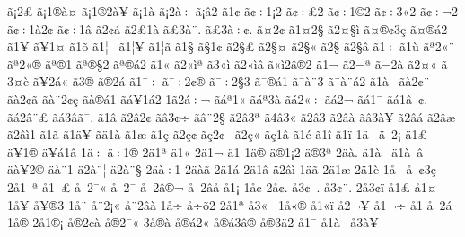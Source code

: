 {^^e3^^a12^^a3
^^e3^^a11^^ae^^e0^^a4
^^e3^^a11^^ae2^^e0^^a5
^^e3^^a11^^e0
^^e3^^a12^^e0^^f7
^^e3^^a1^^e22
^^e31^^a2
^^e3^^a2^^f71^^a12
^^e3^^a2^^f7^^a32
^^e3^^a2^^f71^^a92
^^e3^^a2^^f73^^ab2
^^e3^^a2^^f7^^ac2
^^e3^^a2^^f71^^e02^^a2
^^e3^^a2^^f71^^e2
^^e32^^a2^^e1
^^e32^^a31^^e0
^^e3^^a33^^e0^^a8.
^^e3^^a33^^e0^^f7^^a2.
^^e3^^a42^^a2
^^e31^^a42^^a7
^^e32^^a4^^a7^^ec
^^e3^^a4^^ae^^a23^^e7
^^e3^^a4^^ae^^e12
^^e31^^a5
^^e3^^a51^^a4
^^e31^^f5
^^e31^^a6^^a0
^^e31^^a6^^a5
^^e31^^a6^^e3
^^e31^^a7
^^e3^^a71^^a2
^^e32^^a7^^a3
^^e32^^a7^^a4
^^e32^^a7^^ab
^^e32^^a7^^ad
^^e32^^a7^^e2
^^e31^^f7
^^e31^^f9
^^e3^^aa2^^ab^^a8
^^e3^^aa2^^ab^^ae
^^e3^^aa^^ae1
^^e3^^aa^^ae^^a72
^^e3^^aa^^ae^^e12
^^e31^^ab
^^e32^^ab^^ec^^aa
^^e33^^ab^^ec^^ad
^^e32^^ab^^ec^^e2
^^e3^^ab^^ec2^^e2^^ae2
^^e31^^ac
^^e32^^ac^^aa
^^e3^^ac2^^e0
^^e3^^ad2^^a4^^ab
^^e3^^ad3^^a4^^e8
^^e3^^ad^^a52^^e1^^ab
^^e33^^ae
^^e3^^ae2^^e1
^^e31^^af^^f7
^^e3^^af^^f72^^a2^^ae
^^e3^^af^^f72^^a73
^^e3^^af^^ae^^e11
^^e3^^af^^e0^^a83
^^e3^^af^^e0^^a8^^e12
^^e31^^e0^^a0
^^e3^^e02^^a2^^a8
^^e3^^e02^^a2^^e3
^^e3^^e0^^a82^^a2^^e7
^^e3^^e0^^ae^^e11
^^e3^^e1^^a51^^e12
1^^e32^^e1^^f7^^ac
^^e3^^e1^^aa1^^ab
^^e3^^e1^^aa3^^e0
^^e3^^e12^^ab^^f7
^^e3^^e12^^ac
^^e3^^e11^^af
^^e3^^e11^^e2^^a0^^a2.
^^e3^^e12^^e2^^a8^^a3
^^e3^^e13^^e2^^e3^^af.
^^e31^^e2
^^e32^^e22^^a2
^^e3^^e23^^a2^^f7
^^e3^^e2^^a82^^a7
^^e32^^e23^^aa
^^e34^^e23^^ab
^^e32^^e23^^ad
^^e32^^e2^^e0
^^e3^^e23^^e0^^a5^^ad
^^e32^^e2^^e1
^^e32^^e2^^e6
^^e32^^e2^^ec1
^^e31^^e3
^^e31^^e4^^a5
^^e3^^e41^^e0
^^e31^^e6
^^e31^^e7
^^e32^^e7^^a2
^^e3^^e72^^a2^^a0
^^e32^^e7^^ab
^^e3^^e71^^e2
^^e31^^e9
^^e31^^ee
^^e31^^ef
1^^e4^^a0
^^e4^^a02^^a1
^^e41^^a3
^^e4^^a51^^ae
^^e4^^a5^^e11^^e2
1^^e4^^f7
^^e4^^f71^^ae
2^^e41^^aa
^^e41^^ab
2^^e41^^ac
^^e41^^ad
1^^e4^^ae
^^e4^^ae1^^a12
^^e4^^ae3^^aa
2^^e4^^e0.
^^e41^^e0^^a0^^ad
^^e41^^e0^^a0^^e2
^^e4^^e0^^a52^^a9
^^e4^^e0^^a81
^^e42^^e0^^a8^^a6
^^e42^^e0^^a8^^a7
2^^e4^^e0^^f71
2^^e4^^e0^^e3
2^^e41^^e1
2^^e41^^e2
^^e42^^e2^^ec
1^^e4^^e3
2^^e41^^e6
2^^e41^^e8
1^^e5^^a0
^^e5^^a0^^a23^^e7
2^^e51^^a0^^aa
^^e51^^a0^^ad^^a3
^^e5^^a02^^af^^ab
^^e5^^a02^^af^^ad
^^e5^^a02^^e2^^ae^^ac
^^e5^^a02^^e2^^e5
^^e51^^a1
1^^e5^^a2
2^^e5^^a2.
^^e53^^a2^^a0.
^^e53^^a2^^a8.
2^^e53^^a2^^ef
^^e51^^a3
^^e51^^a4
1^^e5^^a5
^^e5^^a5^^ae3
1^^e5^^a8
^^e5^^a82^^a1^^ab
^^e5^^a82^^e2^^e0
1^^e5^^f7
^^e5^^f7^^f52
2^^e51^^aa
^^e53^^ab^^a0
1^^e5^^ab^^ae
^^e51^^ab^^ef
^^e52^^ac^^a5
^^e51^^ac^^f7
^^e51^^ad
^^e5^^ad^^a02^^e1
1^^e5^^ae
2^^e51^^ae^^a1
^^e5^^ae2^^a2^^e0
^^e5^^ae2^^af^^ab
3^^e5^^ae^^e0
^^e5^^ae^^e12^^ab
^^e5^^ae^^e13^^e2^^ae
^^e5^^ae3^^e42
^^e51^^af
^^e51^^e0^^a0
^^e53^^e0^^a5^^ad
}
